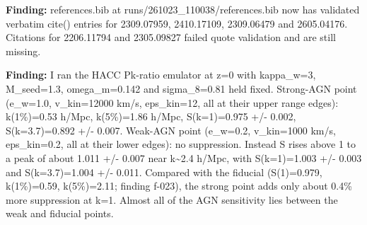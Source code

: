 \documentclass[11pt,a4paper]{article}
\begin{document}
\textbf{Finding:} references.bib at runs/261023\_110038/references.bib now has validated verbatim cite() entries for 2309.07959, 2410.17109, 2309.06479 and 2605.04176. Citations for 2206.11794 and 2305.09827 failed quote validation and are still missing.

\textbf{Finding:} I ran the HACC Pk-ratio emulator at z=0 with kappa\_w=3, M\_seed=1.3, omega\_m=0.142 and sigma\_8=0.81 held fixed. Strong-AGN point (e\_w=1.0, v\_kin=12000 km/s, eps\_kin=12, all at their upper range edges): k(1\%)=0.53 h/Mpc, k(5\%)=1.86 h/Mpc, S(k=1)=0.975 +/- 0.002, S(k=3.7)=0.892 +/- 0.007. Weak-AGN point (e\_w=0.2, v\_kin=1000 km/s, eps\_kin=0.2, all at their lower edges): no suppression. Instead S rises above 1 to a peak of about 1.011 +/- 0.007 near k\textasciitilde{}2.4 h/Mpc, with S(k=1)=1.003 +/- 0.003 and S(k=3.7)=1.004 +/- 0.011. Compared with the fiducial (S(1)=0.979, k(1\%)=0.59, k(5\%)=2.11; finding f-023), the strong point adds only about 0.4\% more suppression at k=1. Almost all of the AGN sensitivity lies between the weak and fiducial points.
\end{document}
